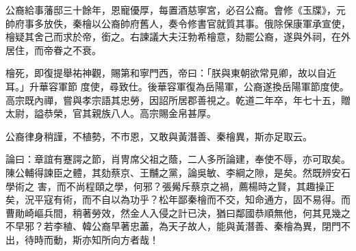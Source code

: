 \begin{pinyinscope}
 公裔給事藩邸三十餘年，恩寵優厚，每置酒慈寧宮，必召公裔。會修《玉牒》，元帥府事多放佚，秦檜以公裔帥府舊人，奏令修書官就質其事。俄除保康軍承宣使，檜疑其舍己而求於帝，銜之。右諫議大夫汪勃希檜意，劾罷公裔，遂與外祠，在外居住，而帝眷之不衰。



 檜死，即復提舉祐神觀，賜第和寧門西，帝曰：「朕與東朝欲常見卿，故以自近耳。」升華容軍節
 度使，尋致仕。後華容軍復為岳陽軍，公裔遂換岳陽軍節度使。高宗既內禪，嘗與孝宗語其忠勞，因詔所居郡善視之。乾道二年卒，年七十五，贈太尉，謚恭榮，官其親族八人。高宗賜金帛甚厚。



 公裔律身稍謹，不植勢，不市恩，又敢與黃潛善、秦檜異，斯亦足取云。



 論曰：章誼有蹇諤之節，肖冑席父祖之蔭，二人多所論建，奉使不辱，亦可取矣。陳公輔得諫臣之體，其劾蔡京、王黼之黨，論吳敏、李綱之隙，是矣。然既辨安石學術之
 害，而不尚程頤之學，何邪？張觷斥蔡京之禍，薦楊時之賢，其趣操正矣，況平寇有術，而不自以為功乎？松年鄙秦檜而不交，知命通方，固不易得。而曹勛崎嶇兵間，稍著勞效，然金人入侵之計已決，猶曰鄰國恭順無他，何其見幾之不早邪？若李稙、韓公裔早著忠藎，為天子故人，能與黃潛善、秦檜為異，閉門不出，待時而動，斯亦知所向方者哉！



\end{pinyinscope}